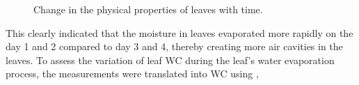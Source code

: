 \documentclass[preprints,article,accept,moreauthors,pdftex]{Definitions/mdpi}
\renewcommand{\^}{\hat}  %
\begin{document}
\begin{figure}[h!]
	\centering
	\hfill
	\caption{Change in the physical properties of leaves with time.}
	\label{fig:measurements}
\end{figure}
%
This clearly indicated that the moisture in leaves evaporated more rapidly on the day 1 and 2 compared to day 3 and 4, thereby creating more air cavities in the leaves. To assess the variation of leaf WC during the leaf's water evaporation process, the measurements were translated into WC using \cite{Nie2017,Cao2015},
\end{document}
